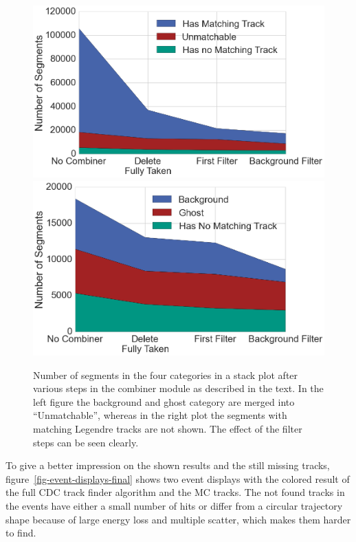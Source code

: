 \begin{figure}
  \centering
  \includegraphics[width=0.48\linewidth]{figures/workflow/remaining_segments_full.png}
  \includegraphics[width=0.48\linewidth]{figures/workflow/remaining_segments_detail.png}
  \caption{Number of segments in the four categories in a stack plot after various steps in the combiner module as described in the text. In the left figure the background and ghost category are merged into ``Unmatchable'', whereas in the right plot the segments with matching Legendre tracks are not shown. The effect of the filter steps can be seen clearly.}
  \label{fig-remaining-segments-full}
\end{figure}

To give a better impression on the shown results and the still missing tracks, figure~\ref{fig-event-displays-final} shows two event displays with the colored result of the full CDC track finder algorithm and the MC tracks. The not found tracks in the events have either a small number of hits or differ from a circular trajectory shape because of large energy loss and multiple scatter, which makes them harder to find.

